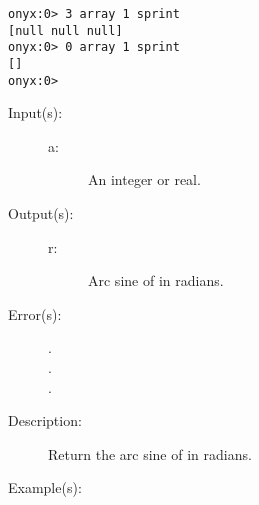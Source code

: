 \begin{description}
\begin{description}
\begin{verbatim}
onyx:0> 3 array 1 sprint
[null null null]
onyx:0> 0 array 1 sprint
[]
onyx:0>
		\end{verbatim}
	\end{description}
\label{systemdict:asin}
\item[{\onyxop{a}{asin}{r}}: ]
	\begin{description}\item[]
	\item[Input(s): ]
		\begin{description}\item[]
		\item[a: ]
			An integer or real.
		\end{description}
	\item[Output(s): ]
		\begin{description}\item[]
		\item[r: ]
			Arc sine of  in radians.
		\end{description}
	\item[Error(s): ]
		\begin{description}\item[]
		\item[.]
		\item[.]
		\item[.]
		\end{description}
	\item[Description: ]
		Return the arc sine of  in radians.
	\item[Example(s): ]\begin{verbatim}


\end{verbatim}
\end{description}
\end{description}

